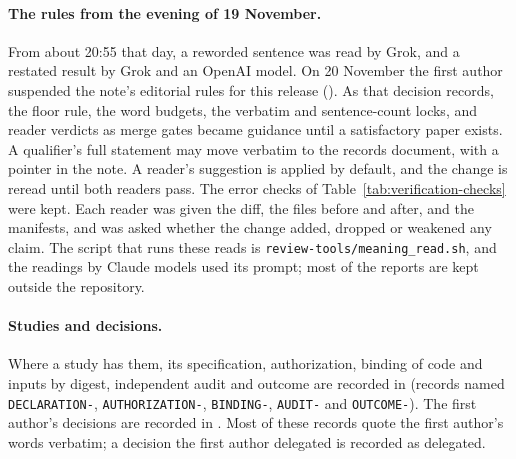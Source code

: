 \paragraph{The rules from the evening of 19 November.} From about 20:55 that day, a reworded sentence was read by Grok, and a restated result by Grok and an OpenAI model. On 20 November the first author suspended the note's editorial rules for this release (). As that decision records, the floor rule, the word budgets, the verbatim and sentence-count locks, and reader verdicts as merge gates became guidance until a satisfactory paper exists. A qualifier's full statement may move verbatim to the records document, with a pointer in the note. A reader's suggestion is applied by default, and the change is reread until both readers pass. The error checks of Table~\ref{tab:verification-checks} were kept. Each reader was given the diff, the files before and after, and the manifests, and was asked whether the change added, dropped or weakened any claim. The script that runs these reads is \texttt{review-tools/meaning\_read.sh}, and the readings by Claude models used its prompt; most of the reports are kept outside the repository.

\paragraph{Studies and decisions.} Where a study has them, its specification, authorization, binding of code and inputs by digest, independent audit and outcome are recorded in  (records named \texttt{DECLARATION-}, \texttt{AUTHORIZATION-}, \texttt{BINDING-}, \texttt{AUDIT-} and \texttt{OUTCOME-}). The first author's decisions are recorded in . Most of these records quote the first author's words verbatim; a decision the first author delegated is recorded as delegated.
